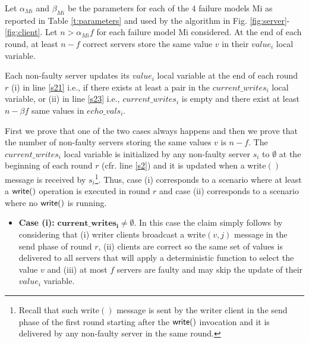 




\begin{lemma}\label{l:consistencyEndGBS}



Let $\alpha_{Mi}$ and $\beta_{Mi}$ be the parameters for each of the $4$ failure models Mi as reported in Table \ref{t:parameters} and used by the algorithm in Fig. \ref{fig:server}-\ref{fig:client}.
Let $n > \alpha_{Mi} f$ for each failure model Mi considered. 
At the end of each round, at least $n-f$ correct servers store the same value $v$ in their $value_i$ local variable.
\end{lemma}

\begin{proofL}
Each non-faulty server updates its $value_i$ local variable at the end of each round $r$ (i) in line  \ref{s21} i.e., if there exists at least a pair in the $current\_writes_i$ local variable, or (ii) in line  \ref{s23} i.e., $current\_writes_i$ is empty and there exist at least $n-\beta f$ same values in $echo\_vals_i$.


First we prove that one of the two cases always happens and then we prove that the number of non-faulty servers storing the same values $v$ is $n-f$.
The $current\_writes_i$ local variable is initialized by any non-faulty server $s_i$ to $\emptyset$ at the beginning of each round $r$ (cfr. line \ref{s2}) and it is updated when a {\sc write}$()$ message is received by $s_i$\footnote{Recall that such {\sc write}$()$ message is sent by the writer client in the send phase of the first round starting after the ${\sf write}()$ invocation and it is delivered by any non-faulty server in the same round.}.
Thus, case (i) corresponds to a scenario where at least a ${\sf write}()$ operation is executed in round $r$ and case (ii) corresponds to a scenario where no ${\sf write}()$ is running.

\begin{itemize}
\item {\bf Case (i):} $\mathbf{current\_writes_i \neq \emptyset.}$ In this case the claim simply follows by considering that (i) writer clients broadcast a {\sc write}$(v, j)$ message in the send phase of round $r$, (ii) clients are correct so the same set of values is delivered to all servers that will apply a deterministic function to select the value $v$ and (iii) at most $f$ servers are faulty and may skip the update of their $value_i$ variable.\\


\end{itemize}
\end{proofL}
